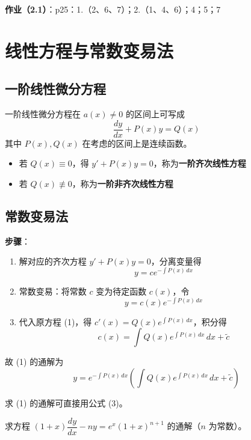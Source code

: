 \textbf{作业（2.1）}：p25：1.（2、6、7）；2.（1、4、6）；4；5；7

\section{线性方程与常数变易法}

\subsection{一阶线性微分方程}

一阶线性微分方程在 $a(x) \neq 0$ 的区间上可写成
\begin{equation}\frac{dy}{dx} + P(x)y = Q(x) \tag{1}\end{equation}
其中 $P(x), Q(x)$ 在考虑的区间上是连续函数。

\begin{itemize}
    \item 若 $Q(x) \equiv 0$，得 $y' + P(x)y = 0$，称为\textbf{一阶齐次线性方程}
    \item 若 $Q(x) \not\equiv 0$，称为\textbf{一阶非齐次线性方程}
\end{itemize}

\subsection{常数变易法}

\textbf{步骤}：
\begin{enumerate}
    \item 解对应的齐次方程 $y' + P(x)y = 0$，分离变量得
    $$y = ce^{-\int P(x)\,dx}$$
    \item 常数变易：将常数 $c$ 变为待定函数 $c(x)$，令
    $$y = c(x)e^{-\int P(x)\,dx}$$
    \item 代入原方程 (1)，得 $c'(x) = Q(x)e^{\int P(x)\,dx}$，积分得
    $$c(x) = \int Q(x)e^{\int P(x)\,dx}\,dx + \tilde{c}$$
\end{enumerate}
故 (1) 的通解为
\begin{equation}y = e^{-\int P(x)\,dx}\left(\int Q(x)e^{\int P(x)\,dx}\,dx + \tilde{c}\right) \tag{3}\end{equation}

\begin{remark}
求 (1) 的通解可直接用公式 (3)。
\end{remark}

\begin{example}
求方程 $(1+x)\dfrac{dy}{dx} - ny = e^x(1+x)^{n+1}$ 的通解（$n$ 为常数）。
\end{example}

